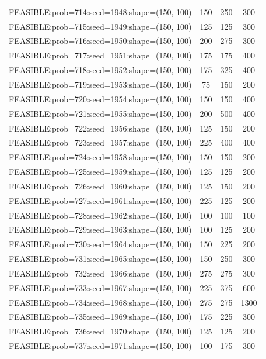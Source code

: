 \begin{longtable}{lccc}
FEASIBLE:prob=714:seed=1948:shape=(150, 100) &  150 &   250 &    300 \\
FEASIBLE:prob=715:seed=1949:shape=(150, 100) &  125 &   125 &    300 \\
FEASIBLE:prob=716:seed=1950:shape=(150, 100) &  200 &   275 &    300 \\
FEASIBLE:prob=717:seed=1951:shape=(150, 100) &  175 &   175 &    400 \\
FEASIBLE:prob=718:seed=1952:shape=(150, 100) &  175 &   325 &    400 \\
FEASIBLE:prob=719:seed=1953:shape=(150, 100) &   75 &   150 &    200 \\
FEASIBLE:prob=720:seed=1954:shape=(150, 100) &  150 &   150 &    400 \\
FEASIBLE:prob=721:seed=1955:shape=(150, 100) &  200 &   500 &    400 \\
FEASIBLE:prob=722:seed=1956:shape=(150, 100) &  125 &   150 &    200 \\
FEASIBLE:prob=723:seed=1957:shape=(150, 100) &  225 &   400 &    400 \\
FEASIBLE:prob=724:seed=1958:shape=(150, 100) &  150 &   150 &    200 \\
FEASIBLE:prob=725:seed=1959:shape=(150, 100) &  125 &   125 &    200 \\
FEASIBLE:prob=726:seed=1960:shape=(150, 100) &  125 &   150 &    200 \\
FEASIBLE:prob=727:seed=1961:shape=(150, 100) &  225 &   125 &    200 \\
FEASIBLE:prob=728:seed=1962:shape=(150, 100) &  100 &   100 &    100 \\
FEASIBLE:prob=729:seed=1963:shape=(150, 100) &  100 &   125 &    200 \\
FEASIBLE:prob=730:seed=1964:shape=(150, 100) &  150 &   225 &    200 \\
FEASIBLE:prob=731:seed=1965:shape=(150, 100) &  150 &   250 &    300 \\
FEASIBLE:prob=732:seed=1966:shape=(150, 100) &  275 &   275 &    300 \\
FEASIBLE:prob=733:seed=1967:shape=(150, 100) &  225 &   375 &    600 \\
FEASIBLE:prob=734:seed=1968:shape=(150, 100) &  275 &   275 &   1300 \\
FEASIBLE:prob=735:seed=1969:shape=(150, 100) &  175 &   225 &    300 \\
FEASIBLE:prob=736:seed=1970:shape=(150, 100) &  125 &   125 &    200 \\
FEASIBLE:prob=737:seed=1971:shape=(150, 100) &  100 &   175 &    300 \\

\end{longtable}
